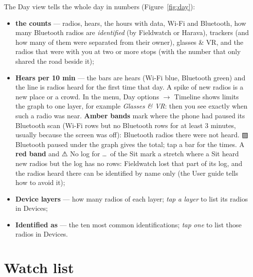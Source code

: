 \documentclass[10pt,a4paper]{article}
\newcommand{\ui}[1]{\textsf{\small #1}}            %
\begin{document}
The Day view tells the whole day in numbers (Figure~\ref{fig:day}):
\begin{itemize}[leftmargin=1.2em]
\item \textbf{the counts} --- radios, hears, the hours with data, Wi-Fi and Bluetooth, how many Bluetooth radios are \emph{identified} (by Fieldwatch or Harava), trackers (and how many of them were separated from their owner), glasses \& VR, and the radios that were with you at two or more stops (with the number that only shared the road beside it);
\item \textbf{Hears per 10 min} --- the bars are hears (Wi-Fi blue, Bluetooth green) and the line is radios heard for the first time that day. A spike of new radios is a new place or a crowd. In the menu, \ui{Day options} $\rightarrow$ \ui{Timeline shows} limits the graph to one layer, for example \emph{Glasses \& VR}: then you see exactly when such a radio was near. \textbf{Amber bands} mark where the phone had paused its Bluetooth scan (Wi-Fi rows but no Bluetooth rows for at least 3 minutes, usually because the screen was off): Bluetooth radios there were not heard. \ui{▨ Bluetooth paused} under the graph gives the total; tap a bar for the times. A \textbf{red band} and \ui{⚠ No log for \dots\ of the Sit} mark a stretch where a Sit heard new radios but the log has no rows: Fieldwatch lost that part of its log, and the radios heard there can be identified by name only (the User guide tells how to avoid it);
\item \textbf{Device layers} --- how many radios of each layer; \emph{tap a layer} to list its radios in Devices;
\item \textbf{Identified as} --- the ten most common identifications; \emph{tap one} to list those radios in Devices.
\end{itemize}

\section{Watch list}\label{sec:watch}
\end{document}
